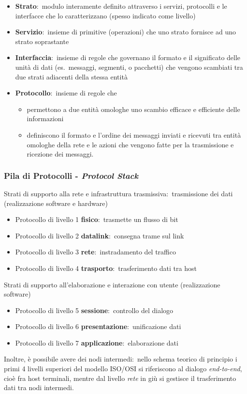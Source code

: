 \begin{itemize}
    \item \textbf{Strato}:\ modulo interamente definito attraverso i servizi, protocolli e le interfacce che lo caratterizzano (spesso indicato come livello)
    \item \textbf{Servizio}:\ insieme di primitive (operazioni) che uno strato fornisce ad uno strato soprastante
    \item \textbf{Interfaccia}:\ insieme di regole che governano il formato e il significato delle unità di dati (es.\ messaggi, segmenti, o pacchetti) che vengono scambiati tra due strati adiacenti della stessa entità
    \item \textbf{Protocollo}:\ insieme di regole che
          \begin{itemize}
              \item permettono a due entità omologhe uno scambio efficace e efficiente delle informazioni
              \item definiscono il formato e l'ordine dei messaggi inviati e ricevuti tra entità omologhe della rete e le azioni che vengono fatte per la trasmissione e ricezione dei messaggi.
          \end{itemize}
\end{itemize}

\subsubsection{Pila di Protocolli - \emph{Protocol Stack}}

Strati di supporto alla rete e infrastruttura trasmissiva:\ trasmissione dei dati (realizzazione software e hardware)
\begin{itemize}
    \item Protocollo di livello 1 \textbf{fisico}:\ trasmette un flusso di bit
    \item Protocollo di livello 2 \textbf{datalink}:\ consegna trame sul link
    \item Protocollo di livello 3 \textbf{rete}:\ instradamento del traffico
    \item Protocollo di livello 4 \textbf{trasporto}:\ trasferimento dati tra host
\end{itemize}
Strati di supporto all'elaborazione e interazione con utente (realizzazione software)
\begin{itemize}
    \item  Protocollo di livello 5 \textbf{sessione}:\ controllo del dialogo
    \item  Protocollo di livello 6 \textbf{presentazione}:\ unificazione dati
    \item  Protocollo di livello 7 \textbf{applicazione}:\ elaborazione dati
\end{itemize}
Inoltre, è possibile avere dei nodi intermedi:\ nello schema teorico di principio i primi 4 livelli superiori del modello ISO/OSI si riferiscono al dialogo \emph{end-to-end}, cioè fra host terminali, mentre dal livello \emph{rete} in giù si gestisce il trasferimento dati tra nodi intermedi.

